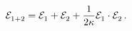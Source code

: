 \begin{equation}\label{boro3.8}
{\cal E}_{1+2}^{}={\cal E}_{1}^{}+{\cal E}_{2}^{}+
\frac{1}{2\kappa}{\cal E}_{1}^{}\cdot{\cal E}_{2}^{}\,.
\end{equation}

